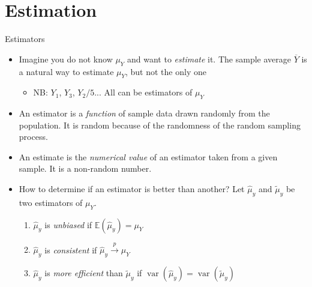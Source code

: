 \documentclass[notes,10pt, aspectratio=169]{beamer}
\begin{document}
\section{Estimation}
\begin{frame}{Estimators}
\begin{itemize}
    \item Imagine you do not know $\mu_Y$ and want to \textit{estimate} it. The sample average $\overline{Y}$ is a natural way to estimate $\mu_Y$, but not the only one
    \begin{itemize}
        \item NB: $Y_1$, $Y_3$, $Y_2/5$... All can be estimators of $\mu_Y$
    \end{itemize}
    \item An estimator is a \textit{function} of sample data drawn randomly from the population. It is random because of the randomness of the random sampling process.
    \item An estimate is the \textit{numerical value} of an estimator taken from a given sample. It is a non-random number.
    \item How to determine if an estimator is better than another? Let $\hat{\mu}_y$ and $\tilde{\mu}_y$ be two estimators of $\mu_Y$.
    \begin{enumerate}
        \item $\hat{\mu}_y$ is \textit{unbiased} if $\mathbb{E}(\hat{\mu}_y) = \mu_Y$
        \item $\hat{\mu}_y$ is \textit{consistent} if $\hat{\mu}_y \xrightarrow{\mathit{p}}\mu_Y$
        \item $\hat{\mu}_y$ is \textit{more efficient}  than $\tilde{\mu}_y$ if $\operatorname{var}(\hat{\mu}_y) = \operatorname{var}(\tilde{\mu}_y)$
    \end{enumerate}
\end{itemize}
\end{frame}
\end{document}
